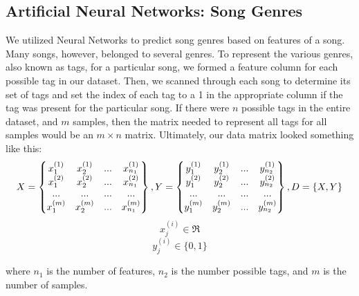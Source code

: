 \documentclass[12pt]{article}
\begin{document}
\subsection{Artificial Neural Networks: Song Genres}
\label{subsec:ann}
We utilized Neural Networks to predict song genres based on features of a song. Many songs, however, belonged to several genres. To represent the various genres, also known as tags, for a particular song, we formed a feature column for each possible tag in our dataset. Then, we scanned through each song to determine its set of tags and set the index of each tag to a 1 in the appropriate column if the tag was present for the particular song. If there were $n$ possible tags in the entire dataset, and $m$ samples, then the matrix needed to represent all tags for all samples would be an $m \times n$ matrix. Ultimately, our data matrix looked something like this:
\begin{equation}
    X = \begin{Bmatrix}
    	x^{(1)}_1 & x^{(1)}_2 & ... & x^{(1)}_{n_1} \\
    	x^{(2)}_1 & x^{(2)}_2 & ... & x^{(2)}_{n_1} \\
    	...       & ...       & ... & ... \\
        x^{(m)}_1 & x^{(m)}_2 & ... & x^{(m)}_{n_1} \\
    \end{Bmatrix},
    \\
    Y = \begin{Bmatrix}
    y^{(1)}_1 & y^{(1)}_2 & ... & y^{(1)}_{n_2} \\
    y^{(2)}_1 & y^{(2)}_2 & ... & y^{(2)}_{n_2} \\
    ...       & ...       & ... & ... \\
    y^{(m)}_1 & y^{(m)}_2 & ... & y^{(m)}_{n_2} \\
    \end{Bmatrix},
    \\
    D = \{X,Y\}
\end{equation} 
\begin{equation}
    x^{(i)}_j \in \Re
\end{equation}
\begin{equation}
    y^{(i)}_j \in \{0, 1\}
\end{equation}

where $n_1$ is the number of features, $n_2$ is the number possible tags, and $m$ is the number of samples.
\end{document}
